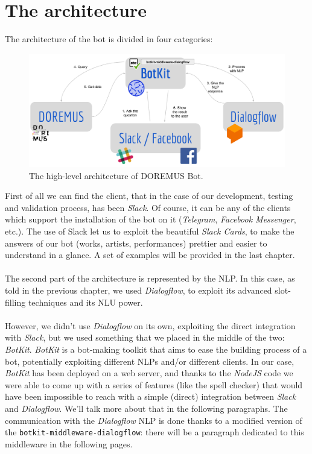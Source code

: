 \documentclass[a4paper,12pt]{report}
\begin{document}
	\section{The architecture}
	The architecture of the bot is divided in four categories:
	\begin{figure}[H]
		\centering
		\includegraphics[scale=0.2]{arch2}
		\caption{The high-level architecture of DOREMUS Bot.}
	\end{figure}
	First of all we can find the client, that in the case of our development, testing and validation process, has been \textit{Slack}. Of course, it can be any of the clients which support the installation of the bot on it (\textit{Telegram}, \textit{Facebook Messenger}, etc.). The use of Slack let us to exploit the beautiful \textit{Slack Cards}, to make the answers of our bot (works, artists, performances) prettier and easier to understand in a glance. A set of examples will be provided in the last chapter.\\\\
	The second part of the architecture is represented by the NLP. In this case, as told in the previous chapter, we used \textit{Dialogflow}, to exploit its advanced slot-filling techniques and its NLU power.\\\\
	However, we didn't use \textit{Dialogflow} on its own, exploiting the direct integration with \textit{Slack}, but we used something that we placed in the middle of the two: \textit{BotKit}. \textit{BotKit} is a bot-making toolkit that aims to ease the building process of a bot, potentially exploiting different NLPs and/or different clients. In our case, \textit{BotKit} has been deployed on a web server, and thanks to the \textit{NodeJS} code we were able to come up with a series of features (like the spell checker) that would have been impossible to reach with a simple (direct) integration between \textit{Slack} and \textit{Dialogflow}. We'll talk more about that in the following paragraphs. The communication with the \textit{Dialogflow} NLP is done thanks to a modified version of the \texttt{botkit-middleware-dialogflow}\cite{bmd}: there will be a paragraph dedicated to this middleware in the following pages.\\\\
\end{document}
